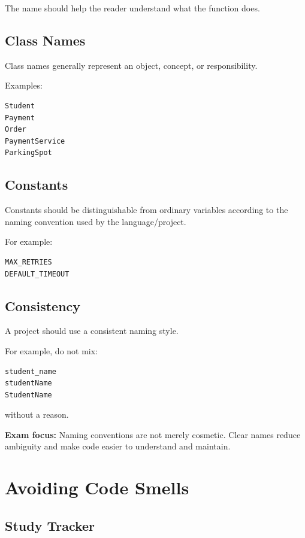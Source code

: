 \documentclass[11pt,a4paper]{article}
\begin{document}
The name should help the reader understand what the function does.

\subsection{Class Names}

Class names generally represent an object, concept, or responsibility.

Examples:

\begin{verbatim}
Student
Payment
Order
PaymentService
ParkingSpot
\end{verbatim}

\subsection{Constants}

Constants should be distinguishable from ordinary variables according to the
naming convention used by the language/project.

For example:

\begin{verbatim}
MAX_RETRIES
DEFAULT_TIMEOUT
\end{verbatim}

\subsection{Consistency}

A project should use a consistent naming style.

For example, do not mix:

\begin{verbatim}
student_name
studentName
StudentName
\end{verbatim}

without a reason.

\begin{exambox}
\textbf{Exam focus:} Naming conventions are not merely cosmetic. Clear names
reduce ambiguity and make code easier to understand and maintain.
\end{exambox}

\section{Avoiding Code Smells}

\subsection{Study Tracker}
\end{document}
